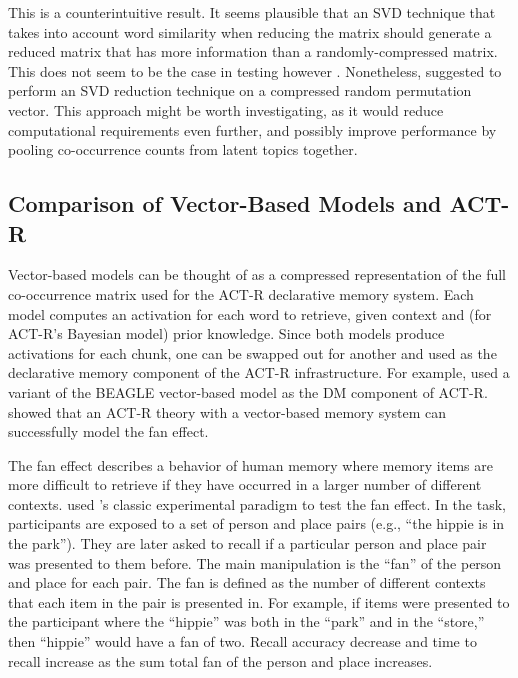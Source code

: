 \documentclass[man,floatsintext,donotrepeattitle]{apa6}
\begin{document}
This is a counterintuitive result.
It seems plausible that an SVD technique that takes into account word similarity when reducing the matrix should generate a reduced matrix that has more information than a randomly-compressed matrix.
This does not seem to be the case in testing however \parencites{Sahlgren2008,Jones2007}.
Nonetheless, \textcite{Kanerva2000} suggested to perform an SVD reduction technique on a compressed random permutation vector.
This approach might be worth investigating, as it would reduce computational requirements even further, and possibly improve performance by pooling co-occurrence counts from latent topics together.

\subsection{Comparison of Vector-Based Models and ACT-R}

Vector-based models can be thought of as a compressed representation of the full co-occurrence matrix used for the ACT-R declarative memory system.
Each model computes an activation for each word to retrieve, given context and (for ACT-R's Bayesian model) prior knowledge.
Since both models produce activations for each chunk, one can be swapped out for another and used as the declarative memory component of the ACT-R infrastructure.
For example, \textcite{Rutledge2007} used a variant of the BEAGLE vector-based model as the DM component of ACT-R.
\citeauthor{Rutledge2008} showed that an ACT-R theory with a vector-based memory system can successfully model the fan effect.

The fan effect describes a behavior of human memory where memory items are more difficult to retrieve if they have occurred in a larger number of different contexts.
\textcite{Rutledge2008} used \textcite{Anderson1974}'s classic experimental paradigm to test the fan effect.
In the task, participants are exposed to a set of person and place pairs (e.g., ``the hippie is in the park'').
They are later asked to recall if a particular person and place pair was presented to them before.
The main manipulation is the ``fan'' of the person and place for each pair.
The fan is defined as the number of different contexts that each item in the pair is presented in.
For example, if items were presented to the participant where the ``hippie'' was both in the ``park'' and in the ``store,'' then ``hippie'' would have a fan of two.
Recall accuracy decrease and time to recall increase as the sum total fan of the person and place increases.
\end{document}
